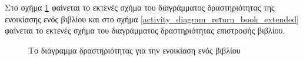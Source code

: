 \documentclass{assignment}
\begin{document}
Στο σχήμα \ref{fig:activity_diagram_rent_book_extended} φαίνεται το εκτενές σχήμα του διαγράμματος δραστηριότητας της ενοικίασης ενός βιβλίου και στο σχήμα \ref{activity_diagram_reτurn_book_extended} φαίνεται το εκτενές σχήμα του διαγράμματος δραστηριότητας επιστροφής βιβλίου.
\begin{figure}
\begin{center}
\caption{Το διάγραμμα δραστηριότητας για την ενοικίαση ενός βιβλίου}
\label{fig:activity_diagram_rent_book_extended}
\end{center}
\end{figure}
\end{document}
